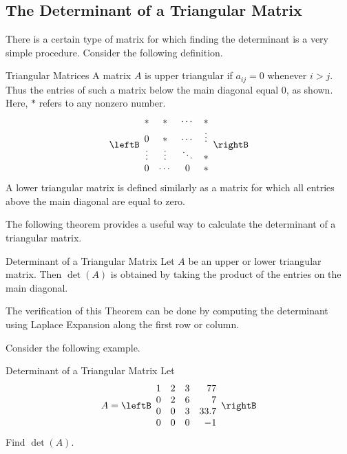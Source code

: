 \subsection{The Determinant of a Triangular Matrix}

There is a certain type of matrix for which finding the determinant is
a very simple procedure. 
Consider the following definition. 

\begin{definition}{Triangular Matrices}\label{def:triangularmatrices}
A matrix $A$ is upper triangular
 if $a_{ij}=0$ whenever $i>j$. Thus the entries of such a
matrix below the main diagonal equal $0$, 
as shown. Here, $\ast$ refers to any nonzero number. 
\begin{equation*}
\leftB
\begin{array}{cccc}
\ast & \ast & \cdots & \ast \\
0 & \ast & \cdots & \vdots \\
\vdots & \vdots & \ddots & \ast \\
0 & \cdots & 0 & \ast
\end{array}
\rightB
\end{equation*}
A lower triangular matrix is defined similarly as a matrix for which all
entries above the
main diagonal are equal to zero.
\end{definition}

The following theorem provides a useful way to calculate the determinant
of a triangular matrix. 

\begin{theorem}{Determinant of a Triangular Matrix}\label{thm:determinantoftriangularmatrix}
Let $A$ be an upper or lower triangular matrix. Then $\det \left( A\right) $
is obtained by taking the product of the entries on the main diagonal.
\end{theorem}

The verification of this Theorem can be done by computing the
determinant using Laplace Expansion along the first row or column. 

Consider the following example. 

\begin{example}{Determinant of a Triangular Matrix}\label{exa:determinantoftriangularmatrix}
Let
\begin{equation*}
A=\leftB
\begin{array}{rrrr}
1 & 2 & 3 & 77 \\
0 & 2 & 6 & 7 \\
0 & 0 & 3 & 33.7 \\
0 & 0 & 0 & -1
\end{array}
\rightB
\end{equation*}
Find $\det \left( A\right) .$
\end{example}


